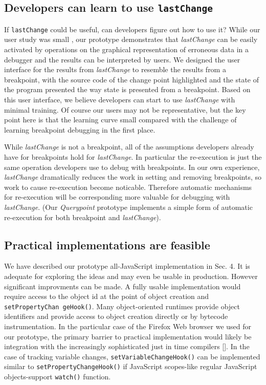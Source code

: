 \documentclass[runningheads,a4paper]{llncs}
\begin{document}
\subsection{Developers can learn to use \protect\texttt{lastChange}}

If \texttt{lastChange} could be useful, can developers figure out how
to use it? While our user study was small , our prototype demonstrates that
\textit{lastChange} can be easily activated by operations on the
graphical representation of erroneous data in a debugger and the 
results can be interpreted by users. We designed the
user interface for the results from \textit{lastChange} to resemble
the results from a breakpoint, with the source code of the change
point highlighted and the state of the program presented the way state
is presented from a breakpoint. Based on this user interface, we
believe developers can start to use \textit{lastChange} with minimal
training. Of course our users may not be representative, but the key point here
is that the learning curve small compared with the challenge of learning 
breakpoint debugging in the first place.

While \textit{lastChange} is not a breakpoint, 
all of the assumptions developers already have for breakpoints hold
for \textit{lastChange}. In particular the re-execution is just the
same operation developers use to debug with breakpoints. 
In our own experience, \textit{lastChange} dramatically reduces the work in
setting and removing breakpoints, so work to cause re-execution  become noticable.
Therefore automatic mechanisms
for re-execution will be corresponding more valuable for debugging
with \textit{lastChange}.  (Our \textit{Querypoint} prototype  
implements a simple form of automatic 
re-execution for both breakpoint and \textit{lastChange}).


\subsection{Practical implementations are feasible}

We have described our prototype all-JavaScript implementation in Sec. 4. It is adequate for 
exploring the ideas and may even be usable in production. However significant 
improvments can be made. A fully usable
implementation would require access to the object id at the point of
object creation and \texttt{setPropertyChan geHook()}. Many
object-oriented runtimes provide object identifiers and 
provide access to object creation directly or by bytecode instrumentation\cite{JPDA}. 
In the particular case of the Firefox Web browser we used for our prototype, the primary barrier
to practical implementation would likely be integration with the
increasingly sophisticated just in time compilers []. In the case of
tracking variable changes, \texttt{setVariableChangeHook()} can be implemented
similar to \texttt{setPropertyChangeHook()} if JavaScript scopes-like regular 
JavaScript objects-support \texttt{watch()} function.
\end{document}
